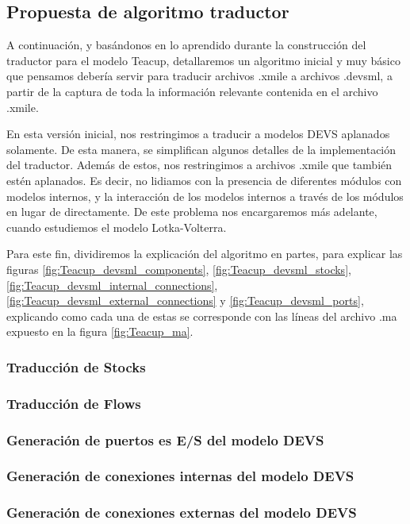 \subsection{Propuesta de algoritmo traductor}
A continuación, y basándonos en lo aprendido durante la construcción del traductor para el modelo Teacup, detallaremos un algoritmo inicial y muy básico que pensamos debería servir para traducir archivos .xmile a archivos .devsml, a partir de la captura de toda la información relevante contenida en el archivo .xmile.

En esta versión inicial, nos restringimos a traducir a modelos DEVS aplanados solamente. De esta manera, se simplifican algunos detalles de la implementación del traductor. Además de estos, nos restringimos a archivos .xmile que también estén aplanados. Es decir, no lidiamos con la presencia de diferentes módulos con modelos internos, y la interacción de los modelos internos a través de los módulos en lugar de directamente. De este problema nos encargaremos más adelante, cuando estudiemos el modelo Lotka-Volterra.

Para este fin, dividiremos la explicación del algoritmo en partes, para explicar las figuras \ref{fig:Teacup_devsml_components}, \ref{fig:Teacup_devsml_stocks}, \ref{fig:Teacup_devsml_internal_connections}, \ref{fig:Teacup_devsml_external_connections} y \ref{fig:Teacup_devsml_ports}, explicando como cada una de estas se corresponde con las líneas del archivo .ma expuesto en la figura \ref{fig:Teacup_ma}.

\subsubsection{Traducción de \textbf{Stocks}}
\subsubsection{Traducción de \textbf{Flows}}
\subsubsection{Generación de puertos es E/S del modelo DEVS}
\subsubsection{Generación de conexiones internas del modelo DEVS}
\subsubsection{Generación de conexiones externas del modelo DEVS}
